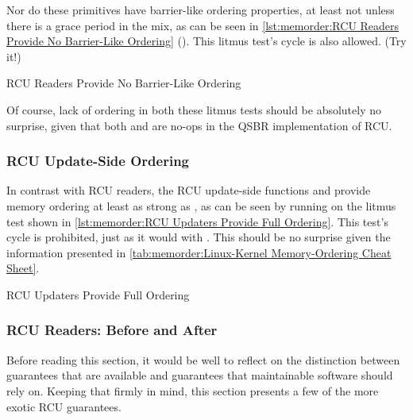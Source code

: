 Nor do these primitives have barrier-like ordering properties,
at least not unless there is a grace period in the mix, as can be seen in
\cref{lst:memorder:RCU Readers Provide No Barrier-Like Ordering}
().
This litmus test's cycle is also allowed.
(Try it!)

\begin{listing}[tbp]

\caption{RCU Readers Provide No Barrier-Like Ordering}
\label{lst:memorder:RCU Readers Provide No Barrier-Like Ordering}
\end{listing}

Of course, lack of ordering in both these litmus tests should be absolutely
no surprise, given that both  and 
are no-ops in the QSBR implementation of RCU\@.

\subsubsection{RCU Update-Side Ordering}
\label{sec:memorder:RCU Update-Side Ordering}

In contrast with RCU readers, the RCU update-side functions
 and 
provide memory ordering at least as strong as ,
as can be seen by running  on the litmus test shown in
\cref{lst:memorder:RCU Updaters Provide Full Ordering}.
This test's cycle is prohibited, just as it would with .
This should be no surprise given the information presented in
\cref{tab:memorder:Linux-Kernel Memory-Ordering Cheat Sheet}.

\begin{listing}[tbp]

\caption{RCU Updaters Provide Full Ordering}
\label{lst:memorder:RCU Updaters Provide Full Ordering}
\end{listing}

\subsubsection{RCU Readers: Before and After}
\label{sec:memorder:RCU Readers: Before and After}

Before reading this section, it would be well to reflect on the distinction
between guarantees that are available and guarantees that maintainable
software should rely on.
Keeping that firmly in mind, this section presents a few of the
more exotic RCU guarantees.

